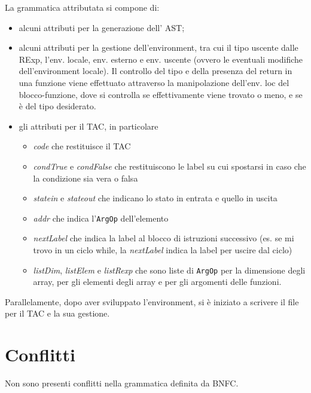 \documentclass{article}
\begin{document}
La grammatica attributata si compone di:
\begin{itemize}
	\item alcuni attributi per la generazione dell' AST;
	\item alcuni attributi per la gestione dell'environment, tra cui il tipo uscente dalle RExp, l'env.
		locale, env. esterno e env. uscente (ovvero le eventuali modifiche dell'environment locale). Il
		controllo del tipo e della presenza del return in una funzione viene effettuato attraverso la manipolazione
		dell'env. loc del blocco-funzione, dove si controlla se effettivamente viene trovato o meno, e se è del tipo 
		desiderato.
	\item gli attributi per il TAC, in particolare 
	\begin{itemize}
	    \item \textit{code} che restituisce il TAC 
	    \item \textit{condTrue} e \textit{condFalse} che restituiscono le label su cui spostarsi in caso che la condizione sia vera o falsa
	    \item \textit{statein} e \textit{stateout} che indicano lo stato in entrata e quello in uscita 
	    \item \textit{addr} che indica l'\texttt{ArgOp} dell'elemento
	    \item \textit{nextLabel} che indica la label al blocco di istruzioni successivo (es. se mi trovo in un ciclo while, la \textit{nextLabel} indica la label per uscire dal ciclo)
	    \item \textit{listDim}, \textit{listElem} e \textit{listRexp} che sono liste di \texttt{ArgOp} per la dimensione degli array, per gli elementi degli array e per gli argomenti delle funzioni.
	\end{itemize}
	
\end{itemize}

Parallelamente, dopo aver sviluppato l'environment, si è iniziato a scrivere il file per il TAC e la sua 
gestione.

\section{Conflitti}
Non sono presenti conflitti nella grammatica definita da BNFC.
\end{document}
